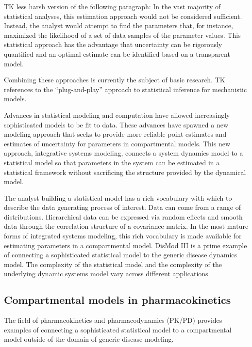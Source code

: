 TK less harsh version of the following paragraph:
In the vast
majority of statistical analyses, this estimation approach would not
be considered sufficient. Instead, the analyst would attempt to find
the parameters that, for instance, maximized the likelihood of a set
of data samples of the parameter values. This statistical approach has
the advantage that uncertainty can be rigorously quantified and an
optimal estimate can be identified based on a transparent
model. 

Combining these approaches is currently the subject of basic research.  TK references to the ``plug-and-play'' approach to statistical inference for mechanistic models.

Advances in statistical modeling and computation have allowed
increasingly sophisticated models to be fit to data. These advances
have spawned a new modeling approach that seeks to provide more
reliable point estimates and estimates of uncertainty for parameters
in compartmental models. This new approach, integrative systems
modeling, connects a system dynamics model to a statistical model so
that parameters in the system can be estimated in a statistical
framework without sacrificing the structure provided by the dynamical
model.

The analyst building a statistical model has a rich vocabulary with
which to describe the data generating process of interest. Data can
come from a range of distributions. Hierarchical data can be expressed
via random effects and smooth data through the correlation structure
of a covariance matrix. In the most mature forms of integrated systems
modeling, this rich vocabulary is made available for estimating
parameters in a compartmental model. DisMod III is a prime example of
connecting a sophisticated statistical model to the generic disease
dynamics model. The complexity of the statistical model and the
complexity of the underlying dynamic systems model vary across
different applications.

\subsection{Compartmental models in pharmacokinetics}
The field of pharmacokinetics and pharmacodynamics (PK/PD) provides
examples of connecting a sophisticated statistical model to a
compartmental model outside of the domain of generic disease modeling.

